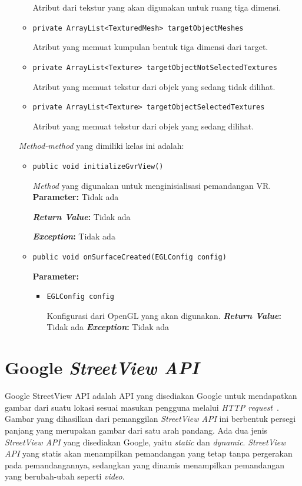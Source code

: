 \begin{enumerate}
\begin{itemize}
  		Atribut dari tekstur yang akan digunakan untuk ruang tiga dimensi.
  		\item \texttt{private ArrayList<TexturedMesh> targetObjectMeshes}
  		
  		Atribut yang memuat kumpulan bentuk tiga dimensi dari target.
  		\item \texttt{private ArrayList<Texture> targetObjectNotSelectedTextures}
  		
  		
  		Atribut yang memuat tekstur dari objek yang sedang tidak dilihat.
  		\item \texttt{private ArrayList<Texture> targetObjectSelectedTextures}
  		
  		Atribut yang memuat tekstur dari objek yang sedang dilihat.
	\end{itemize}
	
	\textit{Method-method} yang dimiliki kelas ini adalah:
	
	\begin{itemize}
		\item \texttt{public void initializeGvrView()}
		
		\textit{Method} yang digunakan untuk menginisialisasi pemandangan VR.
		\textbf{Parameter:} Tidak ada
		
		\textbf{\textit{Return Value}:} Tidak ada
		
		\textbf{\textit{Exception}:} Tidak ada		
		
		\item \texttt{public void onSurfaceCreated(EGLConfig config)}
		
		\textbf{Parameter:}
			\begin{itemize}
			\item \texttt{EGLConfig config}
			
		Konfigurasi dari OpenGL yang akan digunakan.
		\textbf{\textit{Return Value}:} Tidak ada
		\textbf{\textit{Exception}:} Tidak ada		
					
			
			\end{itemize}					

	\end{itemize}
	
\end{enumerate}

\section{Google \it{StreetView API}}
\label{sec:streetview}
Google StreetView API adalah API yang disediakan Google untuk mendapatkan gambar dari suatu lokasi sesuai masukan pengguna melalui \textit{HTTP request}~\cite{streetview-api}. Gambar yang dihasilkan dari pemanggilan \textit{StreetView API} ini berbentuk persegi panjang yang merupakan gambar dari satu arah pandang. Ada dua jenis {\it StreetView API} yang disediakan Google, yaitu {\it static} dan {\it dynamic}. {\it StreetView API} yang statis akan menampilkan pemandangan yang tetap tanpa pergerakan pada pemandangannya, sedangkan yang dinamis menampilkan pemandangan yang berubah-ubah seperti {\it video}.

